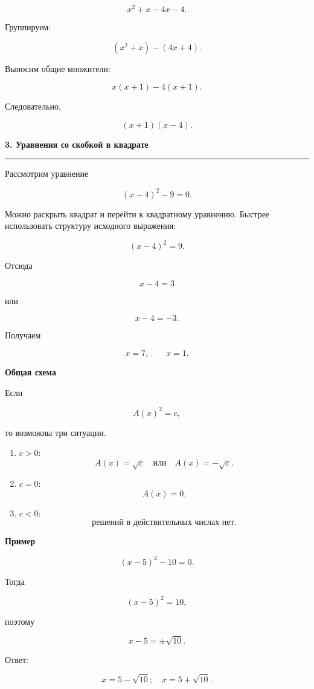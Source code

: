 \documentclass[a4paper,12pt]{article}
\newcommand{\topic}[1]{%
    \vspace{0.5em}
    {\Large\bfseries\textcolor{darkaccent}{#1}}\par
    \vspace{0.2em}
    {\color{accent}\rule{\linewidth}{0.7pt}}
    \vspace{0.5em}
}
\newcommand{\subtopic}[1]{%
    \vspace{0.5em}
    {\large\bfseries\textcolor{darkaccent}{#1}}\par
}
\begin{document}
\[
x^2+x-4x-4.
\]

Группируем:

\[
(x^2+x)-(4x+4).
\]

Выносим общие множители:

\[
x(x+1)-4(x+1).
\]

Следовательно,

\[
\boxed{(x+1)(x-4)}.
\]


\topic{3. Уравнения со скобкой в квадрате}

Рассмотрим уравнение

\[
(x-4)^2-9=0.
\]

Можно раскрыть квадрат и перейти к квадратному уравнению. Быстрее использовать структуру исходного выражения:

\[
(x-4)^2=9.
\]

Отсюда

\[
x-4=3
\]

или

\[
x-4=-3.
\]

Получаем

\[
x=7,\qquad x=1.
\]

\subtopic{Общая схема}

Если

\[
A(x)^2=c,
\]

то возможны три ситуации.

\begin{enumerate}
    \item \(c>0\):
    \[
    A(x)=\sqrt c
    \quad\text{или}\quad
    A(x)=-\sqrt c.
    \]

    \item \(c=0\):
    \[
    A(x)=0.
    \]

    \item \(c<0\):
    \[
    \boxed{\text{решений в действительных числах нет}}.
    \]
\end{enumerate}

\subtopic{Пример}

\[
(x-5)^2-10=0.
\]

Тогда

\[
(x-5)^2=10,
\]

поэтому

\[
x-5=\pm\sqrt{10}.
\]

Ответ:

\[
\boxed{x=5-\sqrt{10};\quad x=5+\sqrt{10}}.
\]
\end{document}
